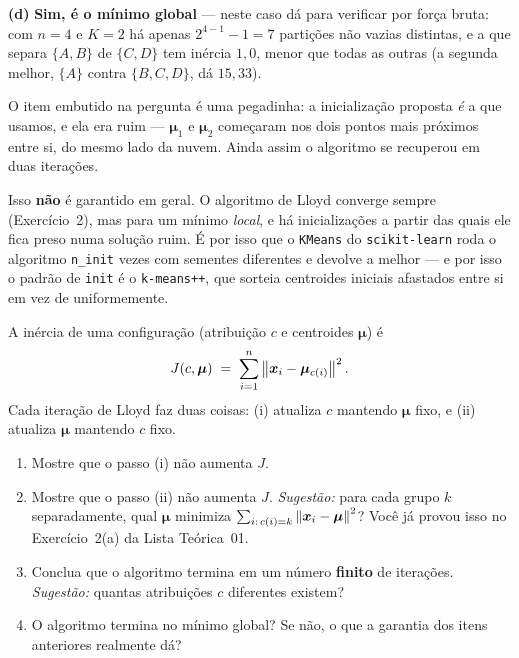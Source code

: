 \documentclass[11pt,a4paper]{article}
\begin{document}
\begin{solucao}
\smallskip
\textbf{(d)} \textbf{Sim, é o mínimo global} --- neste caso dá para verificar por
força bruta: com $n=4$ e $K=2$ há apenas $2^{4-1}-1 = 7$ partições não vazias
distintas, e a que separa $\{A,B\}$ de $\{C,D\}$ tem inércia $1{,}0$, menor que
todas as outras (a segunda melhor, $\{A\}$ contra $\{B,C,D\}$, dá $15{,}33$).

O item embutido na pergunta é uma pegadinha: a inicialização proposta \emph{é} a
que usamos, e ela era ruim --- $\bm\mu_1$ e $\bm\mu_2$ começaram nos dois pontos
mais próximos entre si, do mesmo lado da nuvem. Ainda assim o algoritmo se
recuperou em duas iterações.

Isso \textbf{não} é garantido em geral. O algoritmo de Lloyd converge sempre
(Exercício~2), mas para um mínimo \emph{local}, e há inicializações a partir das
quais ele fica preso numa solução ruim. É por isso que o \texttt{KMeans} do
\texttt{scikit-learn} roda o algoritmo \texttt{n\_init} vezes com sementes
diferentes e devolve a melhor --- e por isso o padrão de \texttt{init} é o
\texttt{k-means++}, que sorteia centroides iniciais afastados entre si em vez de
uniformemente.
\end{solucao}

\begin{exercicio}
A inércia de uma configuração (atribuição $c$ e centroides $\bm\mu$) é
\[
  J(c,\bm\mu) \;=\; \sum_{i=1}^{n} \left\lVert \bm{x}_i - \bm\mu_{c(i)} \right\rVert^2 .
\]
Cada iteração de Lloyd faz duas coisas: (i) atualiza $c$ mantendo $\bm\mu$ fixo,
e (ii) atualiza $\bm\mu$ mantendo $c$ fixo.
\begin{enumerate}[label=(\alph*),leftmargin=1.1cm]
  \item Mostre que o passo (i) não aumenta $J$.
  \item Mostre que o passo (ii) não aumenta $J$. \emph{Sugestão:} para cada grupo
        $k$ separadamente, qual $\bm\mu$ minimiza
        $\sum_{i:\,c(i)=k}\left\lVert \bm{x}_i-\bm\mu \right\rVert^2$? Você já provou isso no
        Exercício~2(a) da Lista Teórica~01.
  \item Conclua que o algoritmo termina em um número \textbf{finito} de
        iterações. \emph{Sugestão:} quantas atribuições $c$ diferentes existem?
  \item O algoritmo termina no mínimo global? Se não, o que a garantia dos itens
        anteriores realmente dá?
\end{enumerate}
\end{exercicio}
\end{document}
